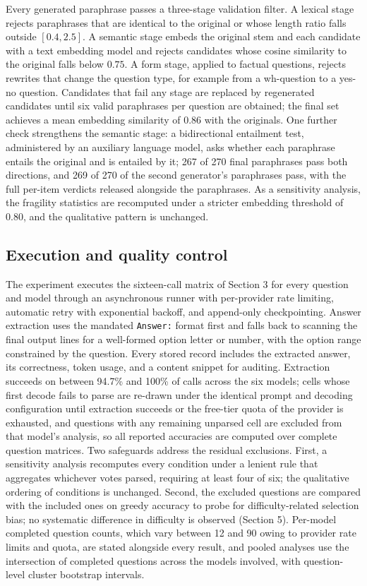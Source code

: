\documentclass[preprint,12pt]{elsarticle}
\begin{document}
Every generated paraphrase passes a three-stage validation filter. A lexical stage rejects paraphrases that are identical to the original or whose length ratio falls outside $[0.4, 2.5]$. A semantic stage embeds the original stem and each candidate with a text embedding model and rejects candidates whose cosine similarity to the original falls below $0.75$. A form stage, applied to factual questions, rejects rewrites that change the question type, for example from a wh-question to a yes-no question. Candidates that fail any stage are replaced by regenerated candidates until six valid paraphrases per question are obtained; the final set achieves a mean embedding similarity of $0.86$ with the originals. One further check strengthens the semantic stage: a bidirectional entailment test, administered by an auxiliary language model, asks whether each paraphrase entails the original and is entailed by it; 267 of 270 final paraphrases pass both directions, and 269 of 270 of the second generator's paraphrases pass, with the full per-item verdicts released alongside the paraphrases. As a sensitivity analysis, the fragility statistics are recomputed under a stricter embedding threshold of 0.80, and the qualitative pattern is unchanged.

\subsection{Execution and quality control}

The experiment executes the sixteen-call matrix of Section 3 for every question and model through an asynchronous runner with per-provider rate limiting, automatic retry with exponential backoff, and append-only checkpointing. Answer extraction uses the mandated \texttt{Answer:} format first and falls back to scanning the final output lines for a well-formed option letter or number, with the option range constrained by the question. Every stored record includes the extracted answer, its correctness, token usage, and a content snippet for auditing. Extraction succeeds on between 94.7\% and 100\% of calls across the six models; cells whose first decode fails to parse are re-drawn under the identical prompt and decoding configuration until extraction succeeds or the free-tier quota of the provider is exhausted, and questions with any remaining unparsed cell are excluded from that model's analysis, so all reported accuracies are computed over complete question matrices. Two safeguards address the residual exclusions. First, a sensitivity analysis recomputes every condition under a lenient rule that aggregates whichever votes parsed, requiring at least four of six; the qualitative ordering of conditions is unchanged. Second, the excluded questions are compared with the included ones on greedy accuracy to probe for difficulty-related selection bias; no systematic difference in difficulty is observed (Section 5). Per-model completed question counts, which vary between 12 and 90 owing to provider rate limits and quota, are stated alongside every result, and pooled analyses use the intersection of completed questions across the models involved, with question-level cluster bootstrap intervals.
\end{document}

